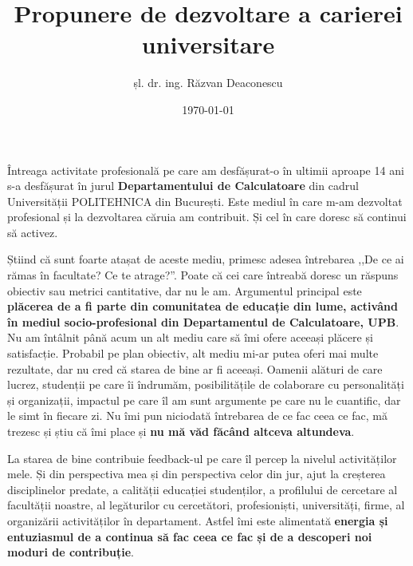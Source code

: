 \documentclass[11pt,a4paper]{article}
\title{Propunere de dezvoltare a carierei universitare}
\author{șl. dr. ing. Răzvan Deaconescu}
\date{\today}
\begin{document}
\maketitle


Întreaga activitate profesională pe care am desfășurat-o în ultimii aproape 14 ani s-a desfășurat în jurul \textbf{Departamentului de Calculatoare} din cadrul Universității POLITEHNICA din București. Este mediul în care m-am dezvoltat profesional și la dezvoltarea căruia am contribuit. Și cel în care doresc să continui să activez.

Știind că sunt foarte atașat de aceste mediu, primesc adesea întrebarea ,,De ce ai rămas în facultate? Ce te atrage?''. Poate că cei care întreabă doresc un răspuns obiectiv sau metrici cantitative, dar nu le am. Argumentul principal este \textbf{plăcerea de a fi parte din comunitatea de educație din lume, activând în mediul socio-profesional din Departamentul de Calculatoare, UPB}. Nu am întâlnit până acum un alt mediu care să îmi ofere aceeași plăcere și satisfacție. Probabil pe plan obiectiv, alt mediu mi-ar putea oferi mai multe rezultate, dar nu cred că starea de bine ar fi aceeași. Oamenii alături de care lucrez, studenții pe care îi îndrumăm, posibilitățile de colaborare cu personalități și organizații, impactul pe care îl am sunt argumente pe care nu le cuantific, dar le simt în fiecare zi. Nu îmi pun niciodată întrebarea de ce fac ceea ce fac, mă trezesc și știu că îmi place și \textbf{nu mă văd făcând altceva altundeva}.

La starea de bine contribuie feedback-ul pe care îl percep la nivelul activităților mele. Și din perspectiva mea și din perspectiva celor din jur, ajut la creșterea disciplinelor predate, a calității educației studenților, a profilului de cercetare al facultății noastre, al legăturilor cu cercetători, profesioniști, universități, firme, al organizării activităților în departament. Astfel îmi este alimentată \textbf{energia și entuziasmul de a continua să fac ceea ce fac și de a descoperi noi moduri de contribuție}.
\end{document}
